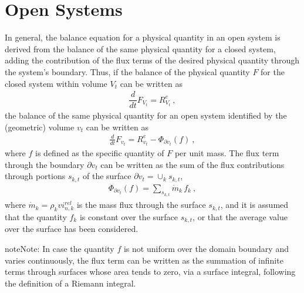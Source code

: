 \documentclass[letterpaper,10pt,english]{jupyterBook}
\begin{document}
\section{Open Systems}
\label{\detokenize{ch/principles-open:open-systems}}\label{\detokenize{ch/principles-open:physics-hs-thermodynamics-foundation-principles-open}}\label{\detokenize{ch/principles-open::doc}}
\sphinxAtStartPar
In general, the balance equation for a physical quantity in an open system is derived from the balance of the same physical quantity for a closed system, adding the contribution of the flux terms of the desired physical quantity through the system’s boundary. Thus, if the balance of the physical quantity \(F\) for the closed system within volume \(V_t\) can be written as
\begin{equation*}
\begin{split}\dfrac{d}{dt} F_{V_t} = R^e_{V_t} \ ,\end{split}
\end{equation*}
\sphinxAtStartPar
the balance of the same physical quantity for an open system identified by the (geometric) volume \(v_t\) can be written as
\begin{equation*}
\begin{split}\frac{d}{dt} F_{v_t} = R^e_{v_t} - \Phi_{\partial v_t}(f) \ , \end{split}
\end{equation*}
\sphinxAtStartPar
where \(f\) is defined as the specific quantity of \(F\) per unit mass. The flux term through the boundary \(\partial v_t\) can be written as the sum of the flux contributions through portions \(s_{k,t}\) of the surface \(\partial v_t = \cup_k s_{k,t}\),
\begin{equation*}
\begin{split}\Phi_{\partial v_t}(f) = \sum_{s_{k,t}} \dot{m}_k \, f_k \ ,\end{split}
\end{equation*}
\sphinxAtStartPar
where \(\dot{m}_k = \rho_k vi^{rel}_{n,k}\) is the mass flux through the surface \(s_{k,t}\), and it is assumed that the quantity \(f_k\) is constant over the surface \(s_{k,t}\), or that the average value over the surface has been considered.

\begin{sphinxadmonition}{note}{Note:}
\sphinxAtStartPar
In case the quantity \(f\) is not uniform over the domain boundary and varies continuously, the flux term can be written as the summation of infinite terms through surfaces whose area tends to zero, via a surface integral, following the definition of a Riemann integral.
\end{sphinxadmonition}
\end{document}
